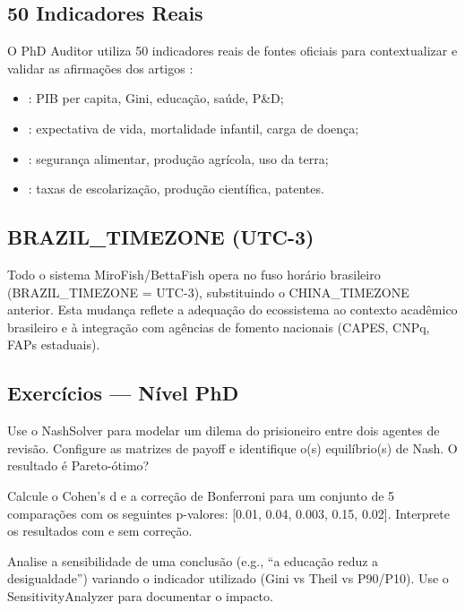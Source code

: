 \subsection{50 Indicadores Reais}

O PhD Auditor utiliza 50 indicadores reais de fontes oficiais para
contextualizar e validar as afirmações dos artigos
\cite{worldbank2024data, who2024global, fao2024food, unesco2024science}:
\begin{itemize}
\item {}: PIB per capita, Gini, educação, saúde,
P\&D;
\item {}: expectativa de vida, mortalidade infantil,
carga de doença;
\item {}: segurança alimentar, produção agrícola, uso
da terra;
\item {}: taxas de escolarização, produção científica,
patentes.
\end{itemize}

\subsection{BRAZIL\_TIMEZONE (UTC-3)}

Todo o sistema MiroFish/BettaFish opera no fuso horário brasileiro
(BRAZIL\_TIMEZONE = UTC-3), substituindo o CHINA\_TIMEZONE anterior.
Esta mudança reflete a adequação do ecossistema ao contexto
acadêmico brasileiro e à integração com agências de fomento nacionais
(CAPES, CNPq, FAPs estaduais).

\subsection{Exercícios — Nível PhD}

\begin{exercicio}
Use o NashSolver para modelar um dilema do prisioneiro entre dois
agentes de revisão. Configure as matrizes de payoff e identifique
o(s) equilíbrio(s) de Nash. O resultado é Pareto-ótimo?
\end{exercicio}

\begin{exercicio}
Calcule o Cohen's d e a correção de Bonferroni para um conjunto
de 5 comparações com os seguintes p-valores: [0.01, 0.04, 0.003,
0.15, 0.02]. Interprete os resultados com e sem correção.
\end{exercicio}

\begin{exercicio}
Analise a sensibilidade de uma conclusão (e.g., ``a educação reduz
a desigualdade'') variando o indicador utilizado (Gini vs Theil vs
P90/P10). Use o SensitivityAnalyzer para documentar o impacto.
\end{exercicio}

